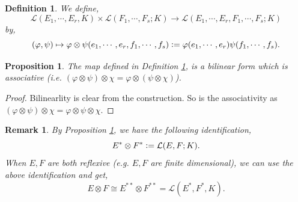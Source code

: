 \documentclass[8pt]{article}
\newtheorem{proposition}{Proposition}[section]
\newtheorem{definition}{Definition}[section]
\newtheorem{remark}{Remark}[section]
\newcommand{\defeq}{\vcentcolon=}
\begin{document}
\begin{definition}
  \label{definition_tensoring_multilinear}
  We define,
  \begin{equation*}
    \mathcal{L}(E_1,\cdots,E_r,K)\times \mathcal{L}(F_1,\cdots,F_s;K)\to \mathcal{L}(E_1,\cdots,E_r,F_1,\cdots,F_s;K)
  \end{equation*}
  by,
  \begin{equation*}
    (\varphi,\psi)\mapsto\varphi\otimes\psi(e_1,\cdots,e_r,f_1,\cdots,f_s)\defeq \varphi(e_1,\cdots,e_r)\psi(f_1,\cdots,f_s).
  \end{equation*}
\end{definition}

\begin{proposition}
  \label{proposition_10_2}
  The map defined in Definition \ref{definition_tensoring_multilinear}, is a bilinear form which is associative (i.e. $(\varphi\otimes\psi)\otimes\chi = \varphi\otimes(\psi\otimes\chi)$).
\end{proposition}

\begin{proof}
  Bilinearlity is clear from the construction. So is the associativity as $(\varphi\otimes\psi)\otimes\chi = \varphi\otimes\psi\otimes\chi$.
\end{proof}

\begin{remark}
  \label{remark_10_1}
  By Proposition \ref{proposition_10_2}, we have the following identification,
  \begin{equation*}
    E^*\otimes F^*\defeq \mathcal{L}(E,F;K).
  \end{equation*}
  When $E,F$ are both reflexive (e.g. $E,F$ are finite dimensional), we can use the above identification and get,
  \begin{equation*}
    E\otimes F \cong E^{**}\otimes F^{**} = \mathcal{L}(E^*,F^*,K).
  \end{equation*}
\end{remark}
\end{document}
